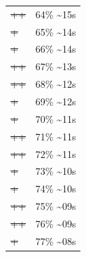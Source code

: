 \documentclass[12pt]{article}
\begin{document}
\begin{center}
\begin{tabular}{ll}
\sout{\sout{\sout{\sout{\sout{\sout{\sout{\sout{\sout{\sout{\sout{\sout{\sout{\sout{\sout{++}}}}}}}}}}}}}}} & 64\% \textasciitilde{}15s\\
\sout{\sout{\sout{\sout{\sout{\sout{\sout{\sout{\sout{\sout{\sout{\sout{\sout{\sout{\sout{\sout{+}}}}}}}}}}}}}}}} & 65\% \textasciitilde{}14s\\
\sout{\sout{\sout{\sout{\sout{\sout{\sout{\sout{\sout{\sout{\sout{\sout{\sout{\sout{\sout{\sout{+}}}}}}}}}}}}}}}} & 66\% \textasciitilde{}14s\\
\sout{\sout{\sout{\sout{\sout{\sout{\sout{\sout{\sout{\sout{\sout{\sout{\sout{\sout{\sout{\sout{++}}}}}}}}}}}}}}}} & 67\% \textasciitilde{}13s\\
\sout{\sout{\sout{\sout{\sout{\sout{\sout{\sout{\sout{\sout{\sout{\sout{\sout{\sout{\sout{\sout{++}}}}}}}}}}}}}}}} & 68\% \textasciitilde{}12s\\
\sout{\sout{\sout{\sout{\sout{\sout{\sout{\sout{\sout{\sout{\sout{\sout{\sout{\sout{\sout{\sout{\sout{+}}}}}}}}}}}}}}}}} & 69\% \textasciitilde{}12s\\
\sout{\sout{\sout{\sout{\sout{\sout{\sout{\sout{\sout{\sout{\sout{\sout{\sout{\sout{\sout{\sout{\sout{+}}}}}}}}}}}}}}}}} & 70\% \textasciitilde{}11s\\
\sout{\sout{\sout{\sout{\sout{\sout{\sout{\sout{\sout{\sout{\sout{\sout{\sout{\sout{\sout{\sout{\sout{++}}}}}}}}}}}}}}}}} & 71\% \textasciitilde{}11s\\
\sout{\sout{\sout{\sout{\sout{\sout{\sout{\sout{\sout{\sout{\sout{\sout{\sout{\sout{\sout{\sout{\sout{++}}}}}}}}}}}}}}}}} & 72\% \textasciitilde{}11s\\
\sout{\sout{\sout{\sout{\sout{\sout{\sout{\sout{\sout{\sout{\sout{\sout{\sout{\sout{\sout{\sout{\sout{\sout{+}}}}}}}}}}}}}}}}}} & 73\% \textasciitilde{}10s\\
\sout{\sout{\sout{\sout{\sout{\sout{\sout{\sout{\sout{\sout{\sout{\sout{\sout{\sout{\sout{\sout{\sout{\sout{+}}}}}}}}}}}}}}}}}} & 74\% \textasciitilde{}10s\\
\sout{\sout{\sout{\sout{\sout{\sout{\sout{\sout{\sout{\sout{\sout{\sout{\sout{\sout{\sout{\sout{\sout{\sout{++}}}}}}}}}}}}}}}}}} & 75\% \textasciitilde{}09s\\
\sout{\sout{\sout{\sout{\sout{\sout{\sout{\sout{\sout{\sout{\sout{\sout{\sout{\sout{\sout{\sout{\sout{\sout{++}}}}}}}}}}}}}}}}}} & 76\% \textasciitilde{}09s\\
\sout{\sout{\sout{\sout{\sout{\sout{\sout{\sout{\sout{\sout{\sout{\sout{\sout{\sout{\sout{\sout{\sout{\sout{\sout{+}}}}}}}}}}}}}}}}}}} & 77\% \textasciitilde{}08s\\

\end{tabular}
\end{center}
\end{document}
